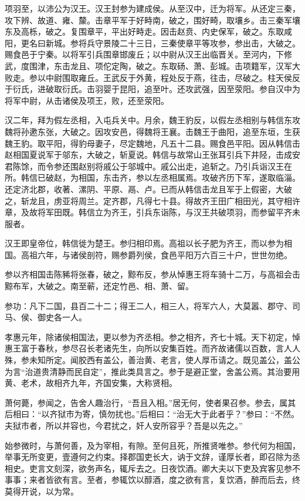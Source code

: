 \documentclass[]{article}
\begin{document}
项羽至，以沛公为汉王。汉王封参为建成侯。从至汉中，迁为将军。从还定三秦，攻下辨、故道、雍、斄。击章平军于好畤南，破之，围好畸，取壤乡。击三秦军壤东及高栎，破之。复围章平，平出好畤走。因击赵贲、内史保军，破之。东取咸阳，更名曰新城。参将兵守景陵二十三日，三秦使章平等攻参，参出击，大破之。赐食邑于宁秦。以将军引兵围章邯废丘；以中尉从汉王出临晋关。至河内，下修武，度围津，东击龙且、项佗定陶，破之。东取砀、萧、彭城。击项籍军，汉军大败走。参以中尉围取雍丘。王武反于外黄，程处反于燕，往击，尽破之。柱天侯反于衍氏，进破取衍氏。击羽婴于昆阳，追至叶。还攻武强，因至荥阳。参自汉中为将军中尉，从击诸侯及项王，败，还至荥阳。

汉二年，拜为假左丞相，入屯兵关中。月余，魏王豹反，以假左丞相别与韩信东攻魏将孙遬东张，大破之。因攻安邑，得魏将王襄。击魏王于曲阳，追至东垣，生获魏王豹。取平阳，得豹母妻子，尽定魏地，凡五十二县。赐食邑平阳。因从韩信击赵相国夏说军于邬东，大破之，斩夏说。韩信与故常山王张耳引兵下井陉，击成安君陈馀，而令参还围赵别将戚公于邬城中。戚公出走，追斩之。乃引兵诣汉王在所。韩信已破赵，为相国，东击齐，参以左丞相属焉。攻破齐历下军，遂取临淄。还定济北郡，收著、漯阴、平原、鬲、卢。已而从韩信击龙且军于上假密，大破之，斩龙且，虏亚将周兰。定齐郡，凡得七十县。得故齐王田广相田光，其守相许章，及故将军田既。韩信立为齐王，引兵东诣陈，与汉王共破项羽，而参留平齐未服者。

汉王即皇帝位，韩信徙为楚王。参归相印焉。高祖以长子肥为齐王，而以参为相国。高祖六年，与诸侯剖符，赐参爵列侯，食邑平阳万六百三十户，世世勿绝。

参以齐相国击陈豨将张春，破之，黥布反，参从悼惠王将车骑十二万，与高祖会击黥布军，大破之。南至蕲，还定竹邑、相、萧、留。

参功：凡下二国，县百二十二；得王二人，相三人，将军六人，大莫嚣、郡守、司马、侯、御史各一人。

孝惠元年，除诸侯相国法，更以参为齐丞相。参之相齐，齐七十城。天下初定，悼惠王富于春秋，参尽召长老诸先生，向所以安集百姓。而齐故诸儒以百数，言人人殊，参未知所定。闻胶西有盖公，善治黄、老言，使人厚币请之。既见盖公，盖公为言``治道贵清静而民自定''，推此类具言之。参于是避正堂，舍盖公焉。其治要用黄、老术，故相齐九年，齐国安集，大称贤相。

萧何薨，参闻之，告舍人趣治行，``吾且入相。''居无何，使者果召参。参去，属其后相曰：``以齐狱市为寄，慎勿扰也。''后相曰：``治无大于此者乎？''参曰：``不然。夫狱市者，所以并容也，今君扰之，奸人安所容乎？吾是以先之。''

始参微时，与萧何善，及为宰相，有隙。至何且死，所推贤唯参。参代何为相国，举事无所变更，壹遵何之约束。择郡国吏长大，讷于文辞，谨厚长者，即召除为丞相史。吏言文刻深，欲务声名，辄斥去之。日夜饮酒。卿大夫以下吏及宾客见参不事事；来者皆欲有言。至者，参辄饮以醇酒，度之欲有言，复饮酒，醉而后去，终莫得开说，以为常。
\end{document}
